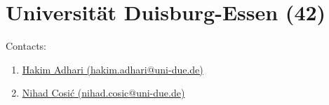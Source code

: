 \section{Universität Duisburg-Essen (42)}
\label{sec:UDE}

Contacts:\begin{enumerate}
 \item {}\href{mailto:hakim.adhari@uni-due.de}{Hakim Adhari (hakim.adhari@uni-due.de)}
 \item {}\href{mailto:nihad.cosic@uni-due.de}{Nihad Cosić (nihad.cosic@uni-due.de)}
\end{enumerate}

